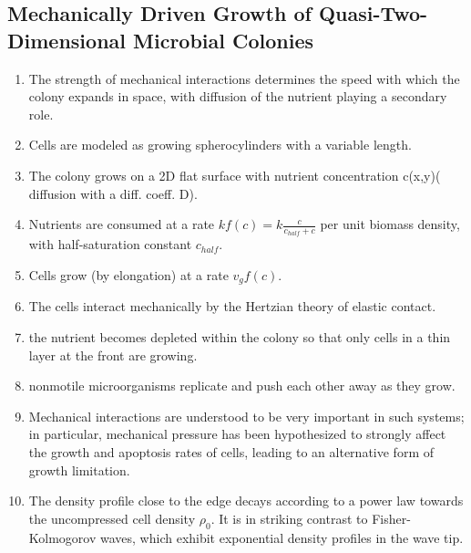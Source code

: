 \documentclass[10pt,a4paper]{article}
\begin{document}
\subsection{Mechanically Driven Growth of Quasi-Two-Dimensional Microbial Colonies \cite{bw:13}}
\begin{enumerate}
 \item The strength of mechanical interactions determines the speed with which the colony expands in space, with diffusion of the nutrient playing a secondary role.
 \item Cells are modeled as growing spherocylinders with a variable length.
 \item The colony grows on a 2D flat surface with nutrient concentration c(x,y)( diffusion with a diff. coeff. D).
 \item Nutrients are consumed at a rate $kf(c) = k\frac{c}{c_{half}+c}$ per unit biomass density, with half-saturation constant $c_{half}$.
 \item Cells grow (by elongation) at a rate $v_gf(c)$. 
 \item The cells interact mechanically  by the Hertzian theory of elastic contact.
 \item the nutrient becomes depleted within the colony so that only cells in a thin layer at the front are growing.
 \item nonmotile microorganisms replicate and push each other away as they grow.
 \item Mechanical interactions are understood to be very important in such systems; 
 in particular, mechanical pressure has been hypothesized to strongly affect the growth and apoptosis rates of cells, 
 leading to an alternative form of growth limitation.
 \item The density profile close to the edge decays according to a power law towards the uncompressed cell density $\rho_0$. 
 It is in striking contrast to Fisher-Kolmogorov waves, which exhibit exponential density profiles in the wave tip.
\end{enumerate}
\end{document}

